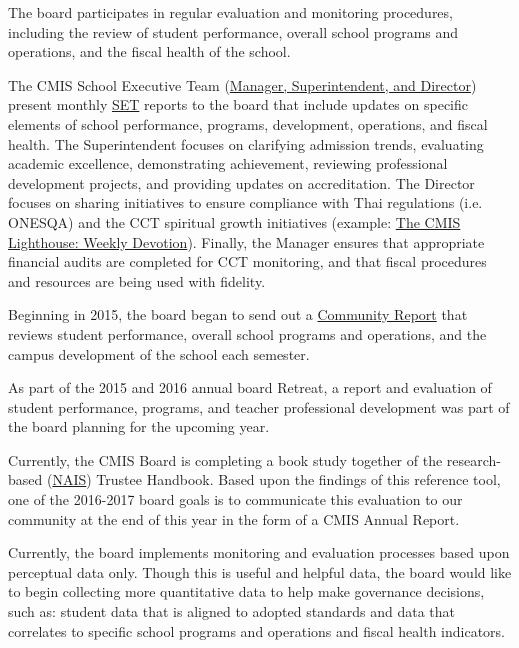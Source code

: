 \begin{findings}
The board participates in regular evaluation and monitoring procedures, including the review of student performance, overall school programs and operations, and the fiscal health of the school.

The CMIS School Executive Team (\href{https://drive.google.com/a/cmis.ac.th/file/d/0Bwny3HLdIIS7di1mY0xFMnJyWmQzNEhON09EREpvY0JRd0Jv/view?usp=sharing}{Manager, Superintendent, and Director}) present monthly \href{https://docs.google.com/document/d/1gz3SiCiPUMU9n-JgGqzGQhgl0r0qAdpSfQPtBK-rwyI/edit}{SET} reports to the board that include updates on specific elements of school performance, programs, development, operations, and fiscal health. The Superintendent focuses on clarifying admission trends, evaluating academic excellence, demonstrating achievement, reviewing professional development projects, and providing updates on accreditation. The Director focuses on sharing initiatives to ensure compliance with Thai regulations (i.e. ONESQA) and the CCT spiritual growth initiatives (example: \href{http://blogs.cmis.ac.th/spiritual-life/2017/02/03/the-lords-prayer-weekly-devotional-60217-100217/}{The CMIS Lighthouse: Weekly Devotion}). Finally, the Manager ensures that appropriate financial audits are completed for CCT monitoring, and that fiscal procedures and resources are being used with fidelity. 

Beginning in 2015, the board began to send out a \href{https://docs.google.com/a/cmis.ac.th/document/d/16DVRIWxzKBgzVMqk8coHlO97SFWthAA_DEx4z6WSHQs/edit?usp=sharing}{Community Report} that reviews student performance, overall school programs and operations, and the campus development of the school each semester.  

As part of the 2015 and 2016 annual board Retreat, a report and evaluation of student performance, programs, and teacher professional development was part of the board planning for the upcoming year. 

Currently, the CMIS Board is completing a book study together of the research-based (\href{http://www.nais.org/Articles/Pages/NAIS-Trustee-Handbook-Resources.aspx}{NAIS}) Trustee Handbook.  Based upon the findings of this reference tool, one of the 2016-2017 board goals is to communicate this evaluation to our community at the end of this year in the form of a CMIS Annual Report.


Currently, the board implements monitoring and evaluation processes based upon perceptual data only. Though this is useful and helpful data, the board would like to begin collecting more quantitative data to help make governance decisions, such as: student data that is aligned to adopted standards and data that correlates to specific school programs and operations and fiscal health indicators. 
\end{findings}

